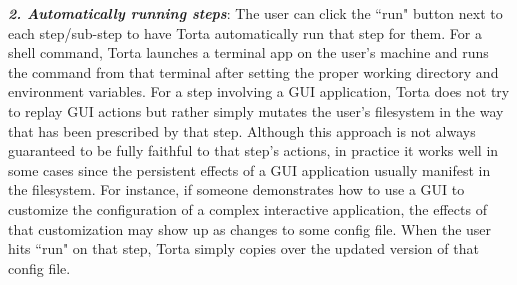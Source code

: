 \emph{\textbf{2. Automatically running steps}}: The user can click the
``run" button next to each step/sub-step to have Torta automatically run
that step for them.  For a shell command, Torta launches a terminal
app on the user's machine and runs the command from that terminal after
setting the proper working directory and environment variables. For a
step involving a GUI application, Torta does not try to replay GUI
actions but rather simply mutates the user's filesystem in the way that
has been prescribed by that step. Although this approach is not
always guaranteed to be fully faithful to that step's actions, in practice it
works well in some cases since the persistent effects of a GUI
application usually manifest in the filesystem. For instance, if someone
demonstrates how to use a GUI to customize the configuration of a
complex interactive application, the effects of that customization
may show up as changes to some config file. When the user hits
``run" on that step, Torta simply copies over the updated version of that
config file.

